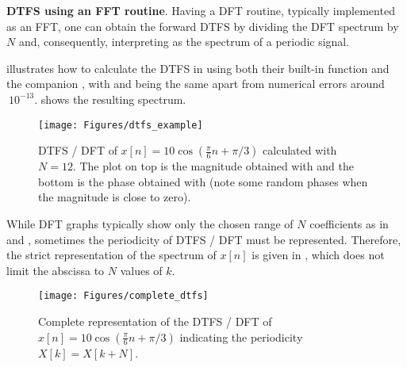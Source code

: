 \bExample \textbf{DTFS using an FFT routine}.
Having a DFT routine, typically implemented as an FFT, one can obtain the forward DTFS by dividing the DFT spectrum by $N$ and, consequently, interpreting as the spectrum of a periodic signal.

 illustrates how to calculate the DTFS in {\matlab} using both their built-in  function and the companion , with  and  being the same apart from numerical errors around $~10^{-13}$.  shows the resulting spectrum.

\begin{figure}[!htb]
        \centering
                \texttt{[image: Figures/dtfs\_example]}        
        \caption[{DTFS / DFT of $x[n] = 10 \cos (\frac{\pi}{6} n + \pi/3)$ calculated with $N=12$.}]{DTFS / DFT of $x[n] = 10 \cos (\frac{\pi}{6} n + \pi/3)$ calculated with $N=12$. The plot on top is the magnitude obtained with  and the bottom is the phase obtained with  (note some random phases when the magnitude is close to zero).\label{fig:dtfs_example}}
\end{figure}




While DFT graphs typically show only the chosen range of $N$ coefficients as in  and , sometimes the periodicity of DTFS / DFT must be represented. Therefore, the strict representation of the spectrum of $x[n]$ is given in
, which does not limit the abscissa to $N$ values of $k$.

\begin{figure}[!htb]
        \centering
                \texttt{[image: Figures/complete\_dtfs]}               
        \caption{Complete representation of the DTFS / DFT of $x[n] = 10 \cos (\frac{\pi}{6} n + \pi/3)$ indicating the periodicity $X[k]=X[k+N]$.\label{fig:complete_dtfs}}
\end{figure}

